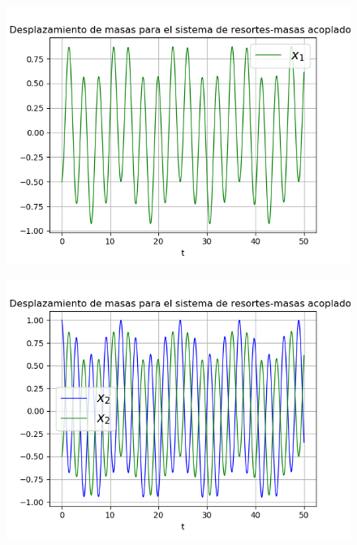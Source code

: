\documentclass{article}
\begin{document}
\begin{figure}[H]
\centering
\includegraphics[scale=0.59]{31_d2.png}
\end{figure}

\begin{figure}[H]
\centering
\includegraphics[scale=0.59]{31_d12.png}
\end{figure}
\end{document}
